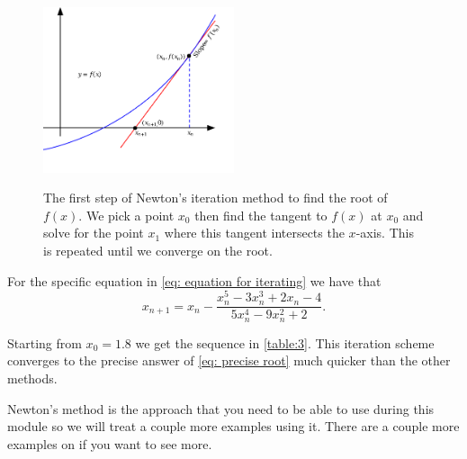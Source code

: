 \begin{figure}[ht]
    \centering
    \includegraphics[width=0.5\textwidth, alt ={A schematic of the first step of Newton's method for finding roots}]{figures/Newton_iteration}
    \caption{The first step of Newton's iteration method to find the root of $f(x)$. We pick a point $x_{0}$ then find the tangent to $f(x)$ at $x_{0}$ and solve for the point $x_{1}$ where this tangent intersects the $x$-axis. This is repeated until we converge on the root.}
\label{fig: Newton iteration}
\end{figure}


For the specific equation in \cref{eq: equation for iterating} we have that
\begin{equation}
x_{n+1}=x_{n}-\frac{x_{n}^{5}-3x_{n}^3+2x_{n}-4}{5x_{n}^{4}-9x_{n}^{2}+2}.
\end{equation}

Starting from $x_{0}=1.8$ we get the sequence in \cref{table:3}. This iteration scheme converges to the precise answer of \cref{eq: precise root} much quicker than the other methods.


Newton's method is the approach that you need to be able to use during this module so we will treat a couple more examples using it. There are a couple more examples on \citep{calcI} if you want to see more.

